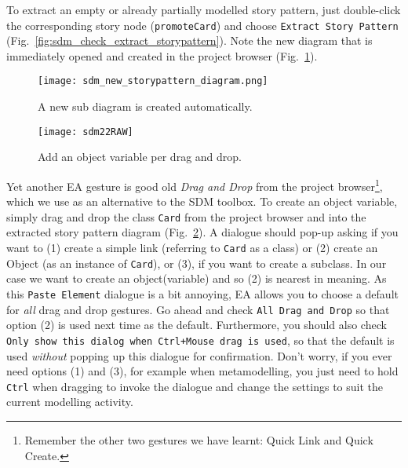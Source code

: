 To extract an empty or already partially modelled story pattern, just double-click the corresponding story node (\texttt{promoteCard}) and choose
\texttt{Extract Story Pattern} (Fig.~\ref{fig:sdm_check_extract_storypattern}). Note the new diagram that is immediately opened and created in the project
browser (Fig.~\ref{fig:sdm_new_sub_diagram}).

\begin{figure}[htbp]
\begin{center}
  \texttt{[image: sdm\_new\_storypattern\_diagram.png]}
  \caption{A new sub diagram is created automatically.}
  \label{fig:sdm_new_sub_diagram}
\end{center}
\end{figure}

\begin{figure}[htbp]
\begin{center}
  \texttt{[image: sdm22RAW]}
  \caption{Add an object variable per drag and drop.}
  \label{fig:sdm_check_bound_card}
\end{center}
\end{figure}

Yet another EA gesture is good old \emph{Drag and Drop} from the project  browser\footnote{Remember the other two gestures we have learnt:
Quick Link and Quick Create.}, which we use as an alternative to the SDM toolbox. To create an object variable, simply drag and drop the class \texttt{Card}
from the project browser and into the extracted story pattern diagram (Fig.~\ref{fig:sdm_check_bound_card}).  A dialogue should pop-up asking if you want to (1)
create a simple link (referring to \texttt{Card} as a class) or (2) create an Object (as an instance of \texttt{Card}), or (3), if you want to create a
subclass. In our case we want to create an object(variable) and so (2) is nearest in meaning. As this \texttt{Paste Element} dialogue is a bit annoying, EA 
allows you to choose a default for \emph{all} drag and drop gestures. Go ahead and check \texttt{All Drag and Drop} so that option (2) is used next time as the
default.  Furthermore, you should also check \texttt{Only show this dialog when Ctrl+Mouse drag is used}, so that the default is used \emph{without} popping up
this dialogue for confirmation. Don't worry, if you ever need options (1) and (3), for example when metamodelling, you  just need to hold \texttt{Ctrl} when
dragging to invoke the dialogue and change  the settings to suit the current modelling activity.

